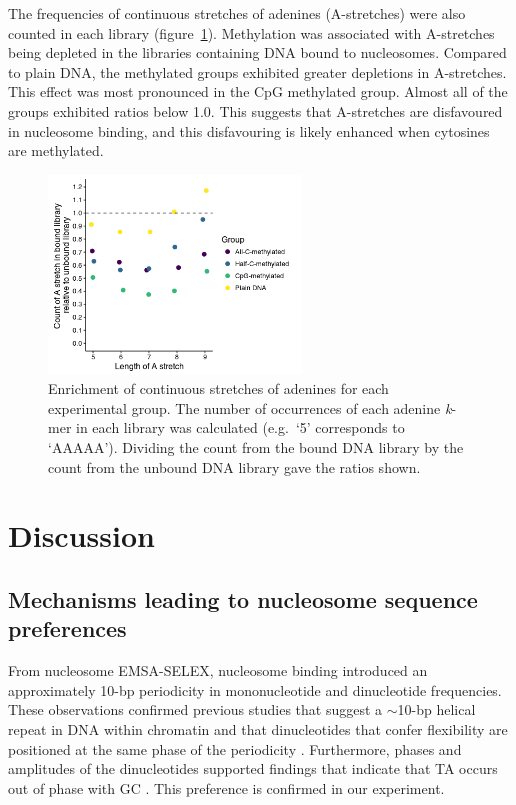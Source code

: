 \documentclass[a4paper, numbers=noenddot]{scrbook}
\begin{document}
The frequencies of continuous stretches of adenines (A-stretches) were also counted in each library (figure~\ref{fig:astretch}).  Methylation was associated with A-stretches being depleted in the libraries containing DNA bound to nucleosomes.  Compared to plain DNA, the methylated groups exhibited greater depletions in A-stretches.  This effect was most pronounced in the CpG methylated group.  Almost all of the groups exhibited ratios below 1.0.  This suggests that A-stretches are disfavoured in nucleosome binding, and this disfavouring is likely enhanced when cytosines are methylated.

\begin{figure}[htbp]
  \centering
  \includegraphics[width=0.6\textwidth]{astretch}
  \caption{Enrichment of continuous stretches of adenines for each experimental group.  The number of occurrences of each adenine \emph{k}-mer in each library was calculated (e.g.\ `5' corresponds to `AAAAA').  Dividing the count from the bound DNA library by the count from the unbound DNA library gave the ratios shown.}
  \label{fig:astretch}
\end{figure}

\section{Discussion}
\label{sec:emsaselex_discussion}

\subsection{Mechanisms leading to nucleosome sequence preferences}
\label{ssec:emsaselex_discussion_seqpref}

From nucleosome EMSA-SELEX, nucleosome binding introduced an approximately 10-bp periodicity in mononucleotide and dinucleotide frequencies.  These observations confirmed previous studies that suggest a $\sim$10-bp helical repeat in DNA within chromatin and that dinucleotides that confer flexibility are positioned at the same phase of the periodicity \citep{struhl_determinants_2013}.  Furthermore, phases and amplitudes of the dinucleotides supported findings that indicate that TA occurs out of phase with GC \citep{struhl_determinants_2013}.  This preference is confirmed in our experiment.
\end{document}
